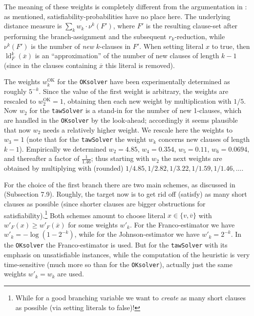 \documentclass[final,3p,times]{elsarticle}
\theoremstyle{definition}
\newcommand{\set}[1]{\{#1\}}
\newcommand{\ol}{\overline}
\newcommand{\tawsolver}{\texttt{tawSolver}}
\newcommand{\oksolver}{\texttt{OKsolver}}
\DeclareMathOperator{\ldeg}{ld} %
\begin{document}
The meaning of these weights is completely different from the argumentation in \cite{hv95}: as mentioned, satisfiability-probabilities have no place here. The underlying distance measure is $\sum_k w_k \cdot \nu^k(F')$, where $F'$ is the resulting clause-set after performing the branch-assignment and the subsequent $r_k$-reduction, while $\nu^k(F')$ is the number of \emph{new} $k$-clauses in $F'$. When setting literal $x$ to true, then $\ldeg_F^k(\ol{x})$ is an ``approximation'' of the number of new clauses of length $k-1$ (since in the clauses containing $\ol{x}$ this literal is removed).

The weights $w_k^{\mathrm{OK}}$ for the \oksolver{} have been experimentally determined as roughly $5^{-k}$. Since the value of the first weight is arbitrary, the weights are rescaled to $w_2^{\mathrm{OK}} = 1$, obtaining then each new weight by multiplication with $1/5$. Now $w_2$ for the \tawsolver{} is a stand-in for the number of new 1-clauses, which are handled in the \oksolver{} by the look-ahead; accordingly it seems plausible that now $w_2$ needs a relatively higher weight. We rescale here the weights to $w_3 = 1$ (note that for the \tawsolver{} the weight $w_k$ concerns new clauses of length $k-1$). Empirically we determined $w_2 = 4.85$, $w_4 = 0.354$, $w_5 = 0.11$, $w_6 = 0.0694$, and thereafter a factor of $\frac{1}{1.46}$; thus starting with $w_2$ the next weights are obtained by multiplying with (rounded) $1/4.85, 1/2.82, 1/3.22, 1/1.59, 1/1.46, \dots$.

For the choice of the first branch there are two main schemes, as discussed in \cite{Kullmann2007HandbuchTau} (Subsection 7.9). Roughly, the target now is to get rid off (satisfy) as many short clauses as possible (since shorter clauses are bigger obstructions for satisfiability).\footnote{While for a good branching variable we want to \emph{create} as many short clauses as possible (via setting literals to false)!} Both schemes amount to choose literal $x \in \set{v,\ol{v}}$ with $w'_F(x) \ge w'_F(\ol{x})$ for some weights $w'_k$. For the Franco-estimator we have $w'_k = -\log(1 - 2^{-k})$, while for the Johnson-estimator we have $w'_k = 2^{-k}$. In the \oksolver{} the Franco-estimator is used. But for the \tawsolver{} with its emphasis on unsatisfiable instances, while the computation of the heuristic is very time-sensitive (much more so than for the \oksolver), actually just the same weights $w'_k= w_k$ are used.
\end{document}
